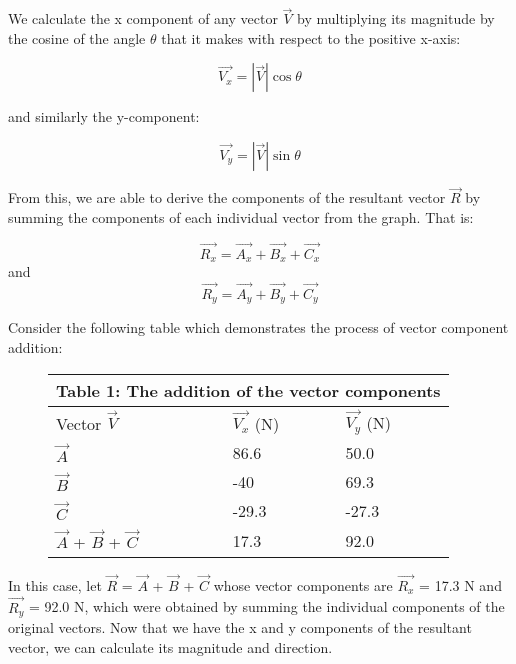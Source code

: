\documentclass[12pt]{article}
\begin{document}
\bigskip

We calculate the x component of any vector $\vec{V}$ by multiplying its magnitude by the cosine of the angle $\theta$ that it makes with respect to the positive x-axis:

\[ \vec{V_x}= |\vec{V}|\cos{\theta}\]

and similarly the y-component:

\[\vec{V_y}= |\vec{V}|\sin{\theta}\]

From this, we are able to derive the components of the resultant vector $\vec{R}$ by summing the components of each individual vector from the graph. That is:

\[\vec{R_x}= \vec{A_x} + \vec{B_x} + \vec{C_x} \]
and
\[\vec{R_y}= \vec{A_y} + \vec{B_y} + \vec{C_y}\]

Consider the following table which demonstrates the process of vector component addition:

\bigskip

\setlength{\tabcolsep}{18pt}
\renewcommand{\arraystretch}{1.5}

\begin{figure}[H]
    \centering
    \begin{tabular}{ |p{3cm}|p{3cm}|p{3cm}| }
        \hline
        \multicolumn{3}{|c|}{Table 1: The addition of the vector components}  \\
        \hline
        Vector $\vec{V}$                  & $\vec{V_x}$ (N) & $\vec{V_y}$ (N) \\
        \hline
        $\vec{A}$                         & 86.6            & 50.0            \\
        $\vec{B}$                         & -40             & 69.3            \\
        $\vec{C}$                         & -29.3           & -27.3           \\
        \hline
        $\vec{A}$ + $\vec{B}$ + $\vec{C}$ & 17.3            & 92.0            \\
        \hline
    \end{tabular}
\end{figure}

\bigskip

In this case, let $\vec{R}$ = $\vec{A}$ + $\vec{B}$ + $\vec{C}$ whose vector components are $\vec{R_x}$ = 17.3 N and $\vec{R_y}$ = 92.0 N, which were obtained by summing the individual components of the original vectors. Now that we have the x and y components of the resultant vector, we can calculate its magnitude and direction.
\end{document}
